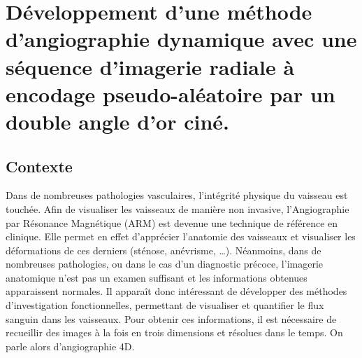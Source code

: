 \chapter{Développement d'une méthode d'angiographie dynamique avec une séquence d'imagerie radiale à encodage pseudo-aléatoire par un double angle d'or ciné.}
\setlength{\footskip}{50pt}

\label{Chap3}
\section{Contexte}

Dans de nombreuses pathologies vasculaires, l’intégrité physique du vaisseau est touchée. Afin de visualiser les vaisseaux de manière non invasive, l’Angiographie par Résonance Magnétique (ARM) est devenue une technique de référence en clinique. Elle permet en effet d’apprécier l’anatomie des vaisseaux et visualiser les déformations de ces derniers (sténose, anévrisme, …). Néanmoins, dans de nombreuses pathologies, ou dans le cas d’un diagnostic précoce, l’imagerie anatomique n’est pas un examen suffisant et les informations obtenues apparaissent normales. Il apparaît donc intéressant de développer des méthodes d'investigation fonctionnelles, permettant de visualiser et quantifier le flux sanguin dans les vaisseaux. Pour obtenir ces informations, il est nécessaire de recueillir des images à la fois en trois dimensions et résolues dans le temps. On parle alors d’angiographie 4D.

